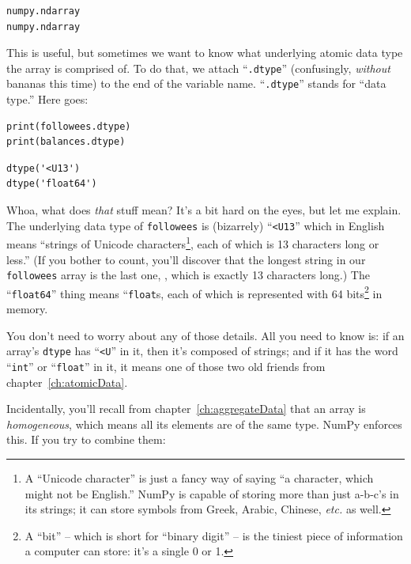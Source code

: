 \begin{Verbatim}[fontsize=\small,samepage=true,frame=leftline,framesep=5mm,framerule=1mm]
numpy.ndarray
numpy.ndarray
\end{Verbatim}

This is useful, but sometimes we want to know what underlying atomic data type
the array is comprised of. To do that, we attach ``\texttt{.dtype}''
(confusingly, \textit{without} bananas this time) to the end of the variable
name. ``\texttt{.dtype}'' stands for ``data type.'' Here goes:

\begin{Verbatim}[fontsize=\small,samepage=true,frame=single,framesep=3mm]
print(followees.dtype)
print(balances.dtype)
\end{Verbatim}

\begin{Verbatim}[fontsize=\small,samepage=true,frame=leftline,framesep=5mm,framerule=1mm]
dtype('<U13')
dtype('float64')
\end{Verbatim}

Whoa, what does \textit{that} stuff mean? It's a bit hard on the eyes, but let
me explain. The underlying data type of \texttt{followees} is (bizarrely)
``\texttt{<U13}'' which in English means ``strings of Unicode
characters\footnote{A ``Unicode character'' is just a fancy way of saying ``a
character, which might not be English.'' NumPy is capable of storing more than
just a-b-c's in its strings; it can store symbols from Greek, Arabic, Chinese,
\textit{etc.} as well.}, each of which is 13 characters long or less.'' (If you
bother to count, you'll discover that the longest string in our
\texttt{followees} array is the last one,
\texttt{\textquotesingle@TheEllenShow\textquotesingle}, which is exactly 13
characters long.) The ``\texttt{float64}'' thing means ``\texttt{float}s, each
of which is represented with 64 bits\footnote{A ``bit'' -- which is short for
``binary digit'' -- is the tiniest piece of information a computer can store:
it's a single 0 or 1.} in memory.

You don't need to worry about any of those details. All you need to know is: if
an array's \texttt{dtype} has ``\texttt{<U}'' in it, then it's composed of
strings; and if it has the word ``\texttt{int}'' or ``\texttt{float}'' in it,
it means one of those two old friends from chapter~\ref{ch:atomicData}.

Incidentally, you'll recall from chapter~\ref{ch:aggregateData} that an array
is \textit{homogeneous}, which means all its elements are of the same type.
NumPy enforces this. If you try to combine them:


